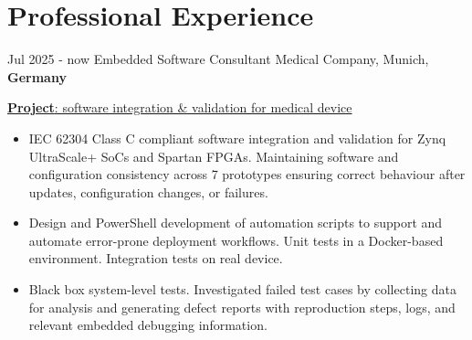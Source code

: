 \documentclass[letterpaper]{twentysecondcv} %
\begin{document}
\makeprofile %

%
%
\section{Professional Experience}

\begin{twenty} %

    \twentyitem
        {Jul 2025 -}
        {now}
        {Embedded Software Consultant}
        {Medical Company, Munich, \textbf{Germany}}
        {}
        {
            \vspace{2 mm}
            \underline{\textbf{Project}: software integration \& validation for medical device}

            \vspace{2 mm}
            \begin{itemize}
                \item IEC 62304 Class C compliant software integration and validation for Zynq UltraScale+ SoCs and Spartan FPGAs. Maintaining software and configuration consistency across 7 prototypes ensuring correct behaviour after updates, configuration changes, or failures.
                \item Design and PowerShell development of automation scripts to support and automate error-prone deployment workflows. Unit tests in a Docker-based environment. Integration tests on real device.
                \item Black box system-level tests. Investigated failed test cases by collecting data for analysis and generating defect reports with reproduction steps, logs, and relevant embedded debugging information.
            \end{itemize}

}
\end{twenty}
\end{document}
